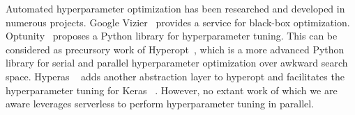 Automated hyperparameter optimization has been researched and developed 
in numerous projects. Google Vizier~\cite{ref:vizier} provides a service for 
black-box optimization. Optunity~\cite{ref:claesen2014hyperparameter} 
proposes a Python library for hyperparameter tuning. 
This can be considered as precursory work of Hyperopt~\cite{ref:hyperopt}, 
which is a more advanced Python library for serial and parallel hyperparameter 
optimization over awkward search space. Hyperas ~\cite{ref:hyperas} adds another 
abstraction layer to hyperopt and facilitates the hyperparameter tuning for 
Keras ~\cite{ref:keras}. However, no extant work of which we are aware leverages
serverless to perform hyperparameter tuning in parallel. 
